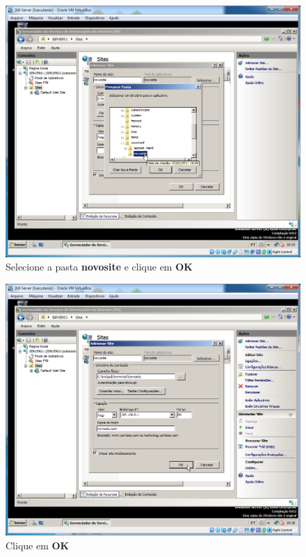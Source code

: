 \documentclass[10pt]{article}
\begin{document}
\begin{figure}[H]
    \centering
    \caption{Selecione a pasta \textbf{novosite} e clique em \textbf{OK}}
    \label{fig:5532041}
    \includegraphics[width=\linewidth]{images/IIS/criando_um_novo_site/041.png}
\end{figure}
\begin{figure}[H]
    \centering
    \caption{Clique em \textbf{OK}}
    \label{fig:5532042}
    \includegraphics[width=\linewidth]{images/IIS/criando_um_novo_site/042.png}
\end{figure}
\end{document}
